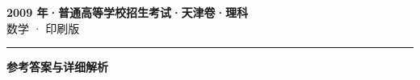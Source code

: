 \documentclass[zihao=5, a4paper]{ctexart}
\begin{document}
\begin{center}
  {\Large\bfseries 2009 年·普通高等学校招生考试·天津卷·理科}\\[4pt]
  {\large 数学 · 印刷版}
\end{center}
\medskip
{}

\par\bigskip\hrule\bigskip
{}
\begin{center}{\large\bfseries 参考答案与详细解析}\end{center}
\smallskip

\end{document}
